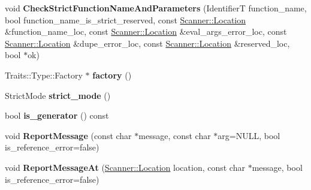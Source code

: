 \begin{DoxyCompactItemize}
\item 
\hypertarget{classv8_1_1internal_1_1_parser_base_ad7c816aa2c735171227cf99cc93ba0db}{}void {\bfseries Check\+Strict\+Function\+Name\+And\+Parameters} (Identifier\+T function\+\_\+name, bool function\+\_\+name\+\_\+is\+\_\+strict\+\_\+reserved, const \hyperlink{structv8_1_1internal_1_1_scanner_1_1_location}{Scanner\+::\+Location} \&function\+\_\+name\+\_\+loc, const \hyperlink{structv8_1_1internal_1_1_scanner_1_1_location}{Scanner\+::\+Location} \&eval\+\_\+args\+\_\+error\+\_\+loc, const \hyperlink{structv8_1_1internal_1_1_scanner_1_1_location}{Scanner\+::\+Location} \&dupe\+\_\+error\+\_\+loc, const \hyperlink{structv8_1_1internal_1_1_scanner_1_1_location}{Scanner\+::\+Location} \&reserved\+\_\+loc, bool $\ast$ok)\label{classv8_1_1internal_1_1_parser_base_ad7c816aa2c735171227cf99cc93ba0db}

\item 
\hypertarget{classv8_1_1internal_1_1_parser_base_aed0e257a9f8d8ca970505812aefb1b07}{}Traits\+::\+Type\+::\+Factory $\ast$ {\bfseries factory} ()\label{classv8_1_1internal_1_1_parser_base_aed0e257a9f8d8ca970505812aefb1b07}

\item 
\hypertarget{classv8_1_1internal_1_1_parser_base_a916c6330fdf51ec110dfd457d281b60c}{}Strict\+Mode {\bfseries strict\+\_\+mode} ()\label{classv8_1_1internal_1_1_parser_base_a916c6330fdf51ec110dfd457d281b60c}

\item 
\hypertarget{classv8_1_1internal_1_1_parser_base_a62553b4e86b78b41c89deb9d81b0f757}{}bool {\bfseries is\+\_\+generator} () const \label{classv8_1_1internal_1_1_parser_base_a62553b4e86b78b41c89deb9d81b0f757}

\item 
\hypertarget{classv8_1_1internal_1_1_parser_base_ab6aced4086bb5cdf921dda31b70f44db}{}void {\bfseries Report\+Message} (const char $\ast$message, const char $\ast$arg=N\+U\+L\+L, bool is\+\_\+reference\+\_\+error=false)\label{classv8_1_1internal_1_1_parser_base_ab6aced4086bb5cdf921dda31b70f44db}

\item 
\hypertarget{classv8_1_1internal_1_1_parser_base_a6c81a60c3d34dc615b327ce1ab6475e1}{}void {\bfseries Report\+Message\+At} (\hyperlink{structv8_1_1internal_1_1_scanner_1_1_location}{Scanner\+::\+Location} location, const char $\ast$message, bool is\+\_\+reference\+\_\+error=false)\label{classv8_1_1internal_1_1_parser_base_a6c81a60c3d34dc615b327ce1ab6475e1}


\end{DoxyCompactItemize}
